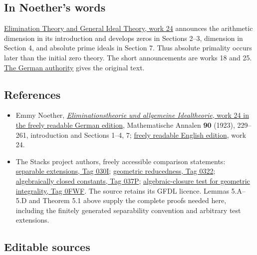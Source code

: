 \documentclass[
]{article}
\providecommand{\tightlist}{%
  \setlength{\itemsep}{0pt}\setlength{\parskip}{0pt}}
\begin{document}
\subsection{In Noether's words}\label{in-noethers-words}

\href{https://zenodo.org/records/21923146/files/00_EMMY_NOETHER_EN_COMPLETE_LINKED_READER.pdf}{Elimination
Theory and General Ideal Theory, work 24} announces the arithmetic
dimension in its introduction and develops zeros in Sections 2--3,
dimension in Section 4, and absolute prime ideals in Section 7. Thus
absolute primality occurs later than the initial zero theory. The short
announcements are works 18 and 25.
\href{https://zenodo.org/records/21908301/files/10-de.pdf}{The German
authority} gives the original text.

\subsection{References}\label{references}

\begin{itemize}
\tightlist
\item
  Emmy Noether,
  \href{https://zenodo.org/records/21908301/files/10-de.pdf}{\emph{Eliminationstheorie
  und allgemeine Idealtheorie}, work 24 in the freely readable German
  edition}, Mathematische Annalen \textbf{90} (1923), 229--261,
  introduction and Sections 1--4, 7;
  \href{https://zenodo.org/records/21923146/files/00_EMMY_NOETHER_EN_COMPLETE_LINKED_READER.pdf}{freely
  readable English edition}, work 24.
\item
  The Stacks project authors, freely accessible comparison statements:
  \href{https://stacks.math.columbia.edu/tag/030I}{separable extensions,
  Tag 030I}; \href{https://stacks.math.columbia.edu/tag/0322}{geometric
  reducedness, Tag 0322};
  \href{https://stacks.math.columbia.edu/tag/037P}{algebraically closed
  constants, Tag 037P};
  \href{https://stacks.math.columbia.edu/tag/0FWF}{algebraic-closure
  test for geometric integrality, Tag 0FWF}. The source retains its GFDL
  licence. Lemmas 5.A--5.D and Theorem 5.1 above supply the complete
  proofs needed here, including the finitely generated separability
  convention and arbitrary test extensions.
\end{itemize}

\subsection{Editable sources}\label{editable-sources}
\end{document}
